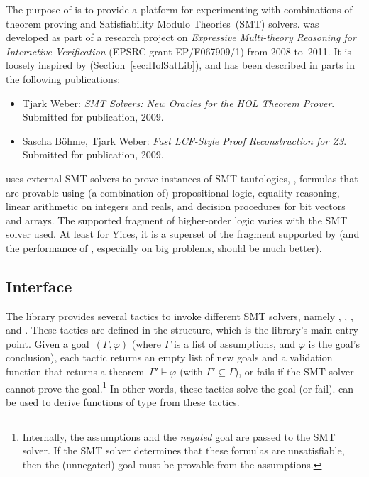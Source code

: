 
\setcounter{sessioncount}{0}

The purpose of  is to provide a platform for
experimenting with combinations of theorem proving and Satisfiability
Modulo Theories~(SMT) solvers.   was developed as part
of a research project on {\it Expressive Multi-theory Reasoning for
  Interactive Verification} (EPSRC grant EP/F067909/1) from 2008
to~2011.  It is loosely inspired by 
(Section~\ref{sec:HolSatLib}), and has been described in parts in the
following publications:
\begin{itemize}
\item Tjark Weber: {\it SMT Solvers: New Oracles for the HOL Theorem
  Prover}. Submitted for publication, 2009.%
\item Sascha B{\"o}hme, Tjark Weber: {\it Fast LCF-Style Proof
  Reconstruction for Z3}. Submitted for publication, 2009.%
\end{itemize}
 uses external SMT solvers to prove instances of SMT
tautologies, \ie, formulas that are provable using (a combination of)
propositional logic, equality reasoning, linear arithmetic on integers
and reals, and decision procedures for bit vectors and arrays.  The
supported fragment of higher-order logic varies with the SMT solver
used.  At least for Yices, it is a superset of the fragment supported
by  (and the performance of ,
especially on big problems, should be much better).

\subsection{Interface}

The library provides several tactics to invoke different SMT solvers,
namely , , , and
.  These tactics are defined in the 
structure, which is the library's main entry point.  Given a
goal~$(\Gamma, \varphi)$ (where $\Gamma$ is a list of assumptions, and
$\varphi$ is the goal's conclusion), each tactic returns an empty list
of new goals and a validation function that returns a theorem~$\Gamma'
\vdash \varphi$ (with $\Gamma' \subseteq \Gamma$), or fails if the SMT
solver cannot prove the goal.\footnote{Internally, the assumptions and
  the \emph{negated} goal are passed to the SMT solver.  If the SMT
  solver determines that these formulas are unsatisfiable, then the
  (unnegated) goal must be provable from the assumptions.}  In other
words, these tactics solve the goal (or fail).
 can be used to derive functions of type
 from these tactics.

